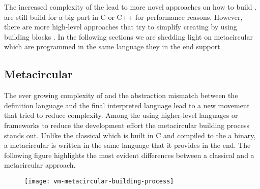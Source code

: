 The increased complexity of the \VMs lead to more novel approaches on how to build \VMs.
\VMs are still build for a big part in C or C++ for performance reasons.
However, there are more high-level approaches that try to simplify creating \VMs by using building blocks \cite{Geof10a}.
In the following sections we are shedding light on metacircular \VMs which are programmed in the same language they in the end support.

\subsection{Metacircular \VMs}
The ever growing complexity of \VMs and the abstraction mismatch between the \VM definition language and the final interpreted language lead to a new movement that tried to reduce complexity.
Among the \VMs using higher-level languages or frameworks to reduce the development effort the metacircular building process stands out.
Unlike the classical \VM which is built in C and compiled to the a binary, a metacircular \VM is written in the same language that it provides in the end.
The following figure highlights the most evident differences between a classical and a metacircular approach.
%
\begin{figure}[h]
	\centering
	\vspace{1mm}
	\texttt{[image: vm-metacircular-building-process]}
	\vspace{-5mm}
\end{figure}
%
